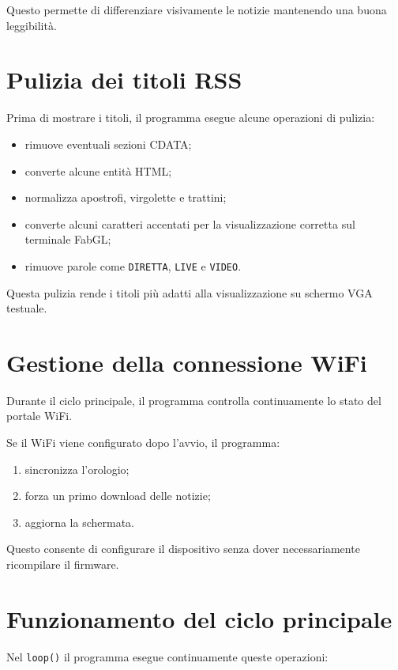 \documentclass[11pt,a4paper]{article}
\begin{document}
	Questo permette di differenziare visivamente le notizie mantenendo una buona leggibilità.
	
	\section{Pulizia dei titoli RSS}
	
	Prima di mostrare i titoli, il programma esegue alcune operazioni di pulizia:
	
	\begin{itemize}
		\item rimuove eventuali sezioni CDATA;
		\item converte alcune entità HTML;
		\item normalizza apostrofi, virgolette e trattini;
		\item converte alcuni caratteri accentati per la visualizzazione corretta sul terminale FabGL;
		\item rimuove parole come \texttt{DIRETTA}, \texttt{LIVE} e \texttt{VIDEO}.
	\end{itemize}
	
	Questa pulizia rende i titoli più adatti alla visualizzazione su schermo VGA testuale.
	
	\section{Gestione della connessione WiFi}
	
	Durante il ciclo principale, il programma controlla continuamente lo stato del portale WiFi.
	
	Se il WiFi viene configurato dopo l'avvio, il programma:
	
	\begin{enumerate}
		\item sincronizza l'orologio;
		\item forza un primo download delle notizie;
		\item aggiorna la schermata.
	\end{enumerate}
	
	Questo consente di configurare il dispositivo senza dover necessariamente ricompilare il firmware.
	
	\section{Funzionamento del ciclo principale}
	
	Nel \texttt{loop()} il programma esegue continuamente queste operazioni:
	
\end{document}
